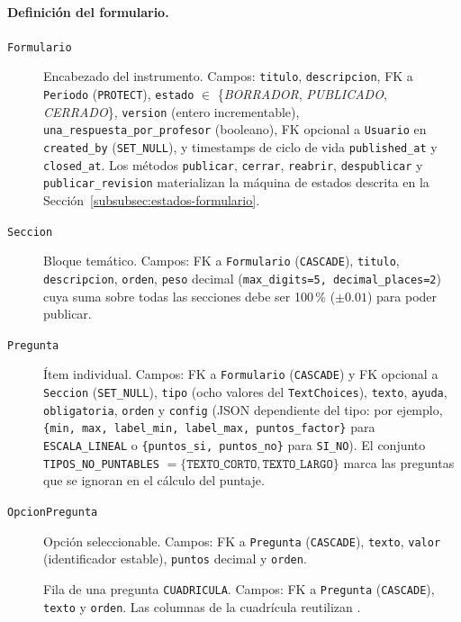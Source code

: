 \paragraph{Definición del formulario.}
\begin{description}
    \item[\texttt{Formulario}] Encabezado del instrumento. Campos: \texttt{titulo}, \texttt{descripcion}, FK a \texttt{Periodo} (\texttt{PROTECT}), \texttt{estado} $\in$ \{\emph{BORRADOR}, \emph{PUBLICADO}, \emph{CERRADO}\}, \texttt{version} (entero incrementable), \texttt{una\_respuesta\_por\_profesor} (booleano), FK opcional a \texttt{Usuario} en \texttt{created\_by} (\texttt{SET\_NULL}), y timestamps de ciclo de vida \texttt{published\_at} y \texttt{closed\_at}. Los métodos \texttt{publicar}, \texttt{cerrar}, \texttt{reabrir}, \texttt{despublicar} y \texttt{publicar\_revision} materializan la máquina de estados descrita en la Sección~\ref{subsubsec:estados-formulario}.
    \item[\texttt{Seccion}] Bloque temático. Campos: FK a \texttt{Formulario} (\texttt{CASCADE}), \texttt{titulo}, \texttt{descripcion}, \texttt{orden}, \texttt{peso} decimal (\texttt{max\_digits=5, decimal\_places=2}) cuya suma sobre todas las secciones debe ser 100\,\% ($\pm 0.01$) para poder publicar.
    \item[\texttt{Pregunta}] Ítem individual. Campos: FK a \texttt{Formulario} (\texttt{CASCADE}) y FK opcional a \texttt{Seccion} (\texttt{SET\_NULL}), \texttt{tipo} (ocho valores del \texttt{TextChoices}), \texttt{texto}, \texttt{ayuda}, \texttt{obligatoria}, \texttt{orden} y \texttt{config} (JSON dependiente del tipo: por ejemplo, \texttt{\{min, max, label\_min, label\_max, puntos\_factor\}} para \texttt{ESCALA\_LINEAL} o \texttt{\{puntos\_si, puntos\_no\}} para \texttt{SI\_NO}). El conjunto \texttt{TIPOS\_NO\_PUNTABLES} $= \{\texttt{TEXTO\_CORTO}, \texttt{TEXTO\_LARGO}\}$ marca las preguntas que se ignoran en el cálculo del puntaje.
    \item[\texttt{OpcionPregunta}] Opción seleccionable. Campos: FK a \texttt{Pregunta} (\texttt{CASCADE}), \texttt{texto}, \texttt{valor} (identificador estable), \texttt{puntos} decimal y \texttt{orden}.
    \item[] Fila de una pregunta \texttt{CUADRICULA}. Campos: FK a \texttt{Pregunta} (\texttt{CASCADE}), \texttt{texto} y \texttt{orden}. Las columnas de la cuadrícula reutilizan .
\end{description}

